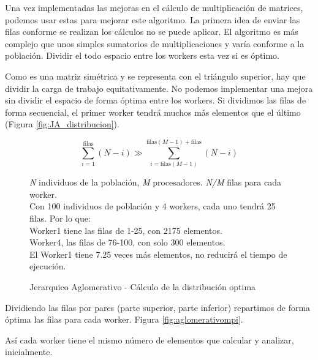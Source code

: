 	
		Una vez implementadas las mejoras en el cálculo de multiplicación de matrices, podemos usar estas para mejorar este algoritmo. La primera idea de enviar las filas conforme se realizan los cálculos no se puede aplicar. El algoritmo es más complejo que unos simples sumatorios de multiplicaciones y varía conforme a la población. Dividir el todo espacio entre los workers esta vez si es óptimo.
		
		Como es una matriz simétrica y se representa con el triángulo superior, hay que dividir la carga de trabajo equitativamente. No podemos implementar una mejora sin dividir el espacio de forma óptima entre los workers. Si dividimos las filas de forma secuencial, el primer worker tendrá muchos más elementos que el último (Figura \ref{fig:JA_distribucion}). 
	
		
		\begin{figure}			
		\begin{mdframed}[roundcorner=5pt]
			\[
			\sum_{i=1}^{\text{filas}} (N - i) \gg \sum_{i=\text{filas}(M-1)}^{\text{filas}(M-1) + \text{filas}} (N - i)
			\]
			\begin{tcolorbox}[boxrule=0.5pt, fontupper=\small]
				
				\textit{N} individuos de la población, \textit{M} procesadores. \textit{N/M} filas para cada worker.\\
				
				Con 100 individuos de población y 4 workers, cada uno tendrá 25 filas. Por lo que:\\
				Worker1 tiene las filas de 1-25, con 2175 elementos. \\
				Worker4, las filas de 76-100, con solo 300 elementos. \\
				El Worker1 tiene 7.25 veces más elementos, no reducirá el tiempo de ejecución.
							
			\end{tcolorbox}
			
		\end{mdframed}
		\label{"fig:JA_distribucion"}
		\caption{Jerarquico Aglomerativo - Cálculo de la distribución optima}
		\end{figure}
		
		
		Dividiendo las filas por pares (parte superior, parte inferior) repartimos de forma óptima las filas para cada worker. Figura \ref{fig:aglomerativompi}.
		
		Así cada worker tiene el mismo número de elementos que calcular y analizar, inicialmente. 
		
